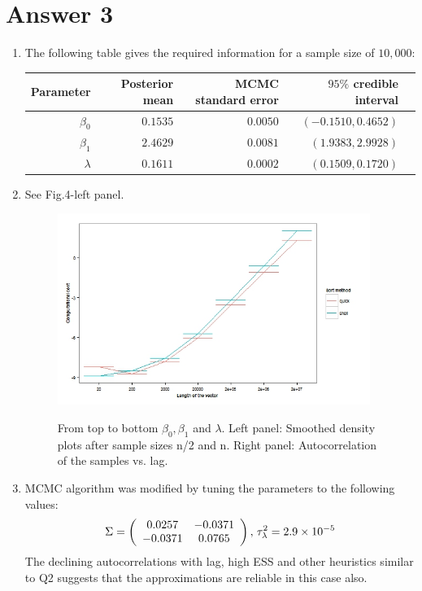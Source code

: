\documentclass[12pt]{article}
\begin{document}
\section*{Answer 3}
\begin{enumerate}[label=(\alph*)]
\item The following table gives the required information for a sample size of $10,000$:
\begin{table}[ht]
\centering
\begin{tabular}{rrrrr}
  \hline
Parameter & Posterior mean & MCMC standard error & $95\%$ credible interval \\ 
  \hline
$\beta_0$ & $0.1535$ & $0.0050$ & $(-0.1510,0.4652)$ \\ 
$\beta_1$ & $2.4629$ & $0.0081$ & $(1.9383,2.9928)$ \\ 
$\lambda$ & $0.1611$ & $0.0002$ & $(0.1509,0.1720)$ \\ 
   \hline
\end{tabular}
\end{table}
\item See Fig.4-left panel.
\begin{figure}[H]
\centering
  {\includegraphics[width=4in]{fig5.jpeg}}
  \caption{From top to bottom $\beta_0,\beta_1 $ and $\lambda$. Left panel: Smoothed density plots after sample sizes n/2 and n. Right panel: Autocorrelation of the samples vs. lag.}
\end{figure}
\item MCMC algorithm was modified by tuning the parameters to the following values:
\[\Sigma=\left(\begin{array}{ccc}
0.0257 & -0.0371 \\
-0.0371 & 0.0765 \\
\end{array} \right),\hspace{0.02in} \tau_{\lambda}^2=2.9\times10^{-5}\]
The declining autocorrelations with lag, high ESS and other heuristics similar to Q2 suggests that the approximations are reliable in this case also.
\end{enumerate} 
\end{document}
